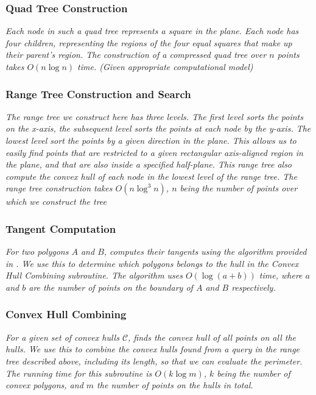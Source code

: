 \documentclass{article}
\begin{document}
\subsubsection{Quad Tree Construction} 
\textit{Each node in such a quad tree represents a square in the plane. Each node has four children, representing the regions of the four equal squares that make up their parent's region. The construction of a compressed quad tree over $n$ points takes $O(n \log n)$ time. (Given appropriate computational model)}

\subsubsection{Range Tree Construction and Search}
\textit{The range tree we construct here has three levels. The first level sorts the points on the x-axis, the subsequent level sorts the points at each node by the y-axis. The lowest level sort the points by a given direction in the plane. This allows us to easily find points that are restricted to a given rectangular axis-aligned region in the plane, and that are also inside a specified half-plane. This range tree also compute the convex hull of each node in the lowest level of the range tree. The range tree construction takes $O(n\log^3n)$, $n$ being the number of points over which we construct the tree}

\subsubsection{Tangent Computation}
\textit{For two polygons $A$ and $B$, computes their tangents using the algorithm provided in \cite{kirkpatrick}. We use this to determine which polygons belongs to the hull in the \textit{Convex Hull Combining} subroutine. The algorithm uses $O(\log(a + b))$ time, where $a$ and $b$ are the number of points on the boundary of $A$ and $B$ respectively.}

\subsubsection{Convex Hull Combining}
\textit{For a given set of convex hulls $\mathcal{C}$, finds the convex hull of all points on all the hulls. We use this to combine the convex hulls found from a query in the range tree described above, including its length, so that we can evaluate the perimeter. The running time for this subroutine is $O(k \log m)$, $k$ being the number of convex polygons, and $m$ the number of points on the hulls in total.}
\end{document}

